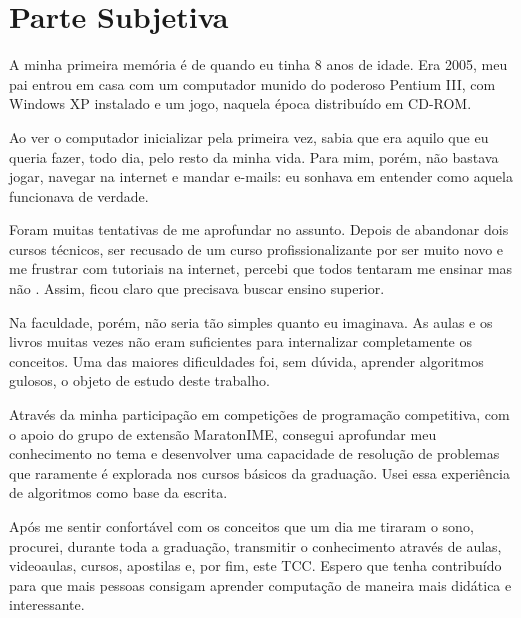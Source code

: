 \chapter{Parte Subjetiva}
\label{subjetiva}


A minha primeira memória é de quando eu tinha 8 anos de idade. Era 2005, meu pai entrou em casa com um computador munido do poderoso Pentium III, com Windows XP instalado e um jogo, naquela época distribuído em CD-ROM.

Ao ver o computador inicializar pela primeira vez, sabia que era aquilo que eu queria fazer, todo dia, pelo resto da minha vida. Para mim, porém, não bastava jogar, navegar na internet e mandar e-mails: eu sonhava em entender como aquela  funcionava de verdade.

Foram muitas tentativas de me aprofundar no assunto. Depois de abandonar dois cursos técnicos, ser recusado de um curso profissionalizante por ser muito novo e me frustrar com tutoriais na internet, percebi que todos tentaram me ensinar  mas não . Assim, ficou claro que precisava buscar ensino superior.

Na faculdade, porém, não seria tão simples quanto eu imaginava. As aulas e os livros muitas vezes não eram suficientes para internalizar completamente os conceitos. Uma das maiores dificuldades foi, sem dúvida, aprender algoritmos gulosos, o objeto de estudo deste trabalho.

Através da minha participação em competições de programação competitiva, com o apoio do grupo de extensão MaratonIME, consegui aprofundar meu conhecimento no tema e desenvolver uma capacidade de resolução de problemas que raramente é explorada nos cursos básicos da graduação. Usei essa experiência de algoritmos  como base da escrita.  

Após me sentir confortável com os conceitos que um dia me tiraram o sono, procurei, durante toda a graduação, transmitir o conhecimento através de aulas, videoaulas, cursos, apostilas e, por fim, este TCC. Espero que tenha contribuído para que mais pessoas consigam aprender computação de maneira mais didática e interessante.